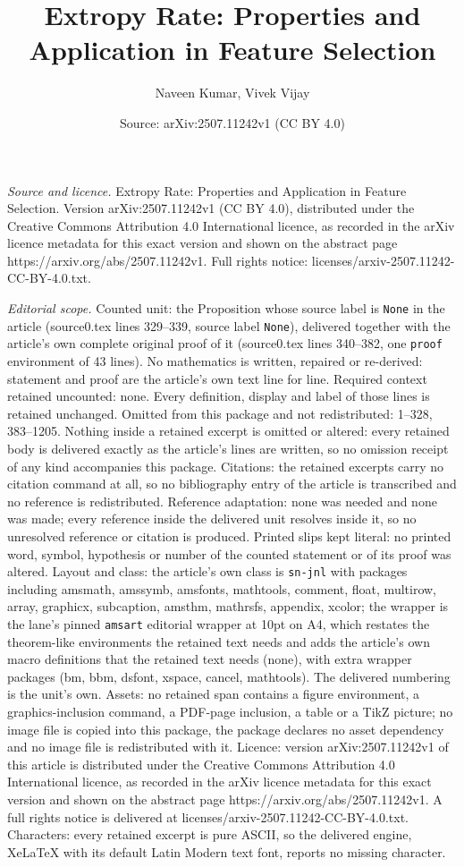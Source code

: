\documentclass[10pt,a4paper]{amsart}
\title[Extropy Rate: Properties and Application in Feature Selectio]{Extropy Rate: Properties and Application in Feature Selection}
\author{Naveen Kumar, Vivek Vijay}
\date{Source: arXiv:2507.11242v1 (CC BY 4.0)}
\begin{document}
\maketitle

\noindent\emph{Source and licence.} Extropy Rate: Properties and Application in Feature Selection. Version arXiv:2507.11242v1 (CC BY 4.0), distributed under the Creative Commons Attribution 4.0 International licence, as recorded in the arXiv licence metadata for this exact version and shown on the abstract page https://arxiv.org/abs/2507.11242v1. Full rights notice: licenses/arxiv-2507.11242-CC-BY-4.0.txt.\par\smallskip

\noindent\textit{Editorial scope.} Counted unit: the Proposition whose source label is \texttt{None} in the article (source0.tex lines 329--339, source label \texttt{None}), delivered together with the article's own complete original proof of it (source0.tex lines 340--382, one \texttt{proof} environment of 43 lines). No mathematics is written, repaired or re-derived: statement and proof are the article's own text line for line. Required context retained uncounted: none. Every definition, display and label of those lines is retained unchanged. Omitted from this package and not redistributed: 1--328, 383--1205. Nothing inside a retained excerpt is omitted or altered: every retained body is delivered exactly as the article's lines are written, so no omission receipt of any kind accompanies this package. Citations: the retained excerpts carry no citation command at all, so no bibliography entry of the article is transcribed and no reference is redistributed. Reference adaptation: none was needed and none was made; every reference inside the delivered unit resolves inside it, so no unresolved reference or citation is produced. Printed slips kept literal: no printed word, symbol, hypothesis or number of the counted statement or of its proof was altered. Layout and class: the article's own class is \texttt{sn-jnl} with packages including amsmath, amssymb, amsfonts, mathtools, comment, float, multirow, array, graphicx, subcaption, amsthm, mathrsfs, appendix, xcolor; the wrapper is the lane's pinned \texttt{amsart} editorial wrapper at 10pt on A4, which restates the theorem-like environments the retained text needs and adds the article's own macro definitions that the retained text needs (none), with extra wrapper packages (bm, bbm, dsfont, xspace, cancel, mathtools). The delivered numbering is the unit's own. Assets: no retained span contains a figure environment, a graphics-inclusion command, a PDF-page inclusion, a table or a TikZ picture; no image file is copied into this package, the package declares no asset dependency and no image file is redistributed with it. Licence: version arXiv:2507.11242v1 of this article is distributed under the Creative Commons Attribution 4.0 International licence, as recorded in the arXiv licence metadata for this exact version and shown on the abstract page https://arxiv.org/abs/2507.11242v1. A full rights notice is delivered at licenses/arxiv-2507.11242-CC-BY-4.0.txt. Characters: every retained excerpt is pure ASCII, so the delivered engine, XeLaTeX with its default Latin Modern text font, reports no missing character.
\end{document}
